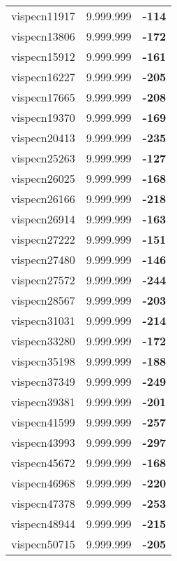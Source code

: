 \begin{tabular}{cc||c}
vispecn11917     & 9.999.999        & {\bf -114}      \\ 
vispecn13806     & 9.999.999        & {\bf -172}      \\ 
vispecn15912     & 9.999.999        & {\bf -161}      \\ 
vispecn16227     & 9.999.999        & {\bf -205}      \\ 
vispecn17665     & 9.999.999        & {\bf -208}      \\ 
vispecn19370     & 9.999.999        & {\bf -169}      \\ 
vispecn20413     & 9.999.999        & {\bf -235}      \\ 
vispecn25263     & 9.999.999        & {\bf -127}      \\ 
vispecn26025     & 9.999.999        & {\bf -168}      \\ 
vispecn26166     & 9.999.999        & {\bf -218}      \\ 
vispecn26914     & 9.999.999        & {\bf -163}      \\ 
vispecn27222     & 9.999.999        & {\bf -151}      \\ 
vispecn27480     & 9.999.999        & {\bf -146}      \\ 
vispecn27572     & 9.999.999        & {\bf -244}      \\ 
vispecn28567     & 9.999.999        & {\bf -203}      \\ 
vispecn31031     & 9.999.999        & {\bf -214}      \\ 
vispecn33280     & 9.999.999        & {\bf -172}      \\ 
vispecn35198     & 9.999.999        & {\bf -188}      \\ 
vispecn37349     & 9.999.999        & {\bf -249}      \\ 
vispecn39381     & 9.999.999        & {\bf -201}      \\ 
vispecn41599     & 9.999.999        & {\bf -257}      \\ 
vispecn43993     & 9.999.999        & {\bf -297}      \\ 
vispecn45672     & 9.999.999        & {\bf -168}      \\ 
vispecn46968     & 9.999.999        & {\bf -220}      \\ 
vispecn47378     & 9.999.999        & {\bf -253}      \\ 
vispecn48944     & 9.999.999        & {\bf -215}      \\ 
vispecn50715     & 9.999.999        & {\bf -205}      \\ 

\end{tabular}
